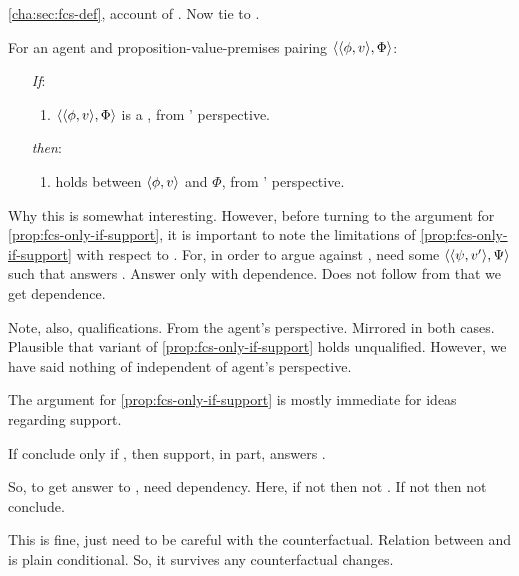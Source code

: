 \begin{note}
  \autoref{cha:sec:fcs-def}, account of .
  Now tie to .
\end{note}

\begin{note}
  \begin{proposition}
    \label{prop:fcs-only-if-support}
    For an agent \vAgent{} and proposition-value-premises pairing \(\langle \langle \phi, v \rangle, \Phi \rangle\):
    \begin{enumerate}
    \item[\emph{If}:]
      \begin{enumerate}[label=\alph*., ref=(\alph*.)]
      \item
        \(\langle \langle \phi, v \rangle, \Phi \rangle\) is a , from \vAgent{}' perspective.
      \end{enumerate}
    \item[\emph{then}:]
      \begin{enumerate}[label=\alph*., ref=(\alph*.), resume]
      \item
         holds between \(\langle \phi, v \rangle\) and \(\Phi\), from \vAgent{}' perspective.
      \end{enumerate}
    \end{enumerate}
    \vspace{-\baselineskip}
  \end{proposition}

  {
    \color{red}
    Why this is somewhat interesting.
  }
  However, before turning to the argument for \autoref{prop:fcs-only-if-support}, it is important to note the limitations of \autoref{prop:fcs-only-if-support} with respect to \issueConstraint{}.
  For, in order to argue against \issueConstraint{}, need some \(\langle \langle \psi, v' \rangle, \Psi \rangle\) such that answers \qWhyV{}.
  Answer \qWhyV{} only with dependence.
  Does not follow from  that we get dependence.

  Note, also, qualifications.
  From the agent's perspective.
  Mirrored in both cases.
  Plausible that variant of \autoref{prop:fcs-only-if-support} holds unqualified.
  However, we have said nothing of \support{} independent of agent's perspective.
\end{note}

\begin{note}
  The argument for \autoref{prop:fcs-only-if-support} is {\color{red} mostly immediate for ideas regarding support}.

  \begin{goal}
    If conclude only if \fc{}, then support, in part, answers \qWhyV{}.
  \end{goal}

  So, to get answer to \qWhyV{}, need dependency.
  Here, if not \support{} then not \fc{}.
  If not \fc{} then not conclude.

  This is fine, just need to be careful with the counterfactual.
  Relation between \support{} and \fc{} is plain conditional.
  So, it survives any counterfactual changes.
\end{note}

